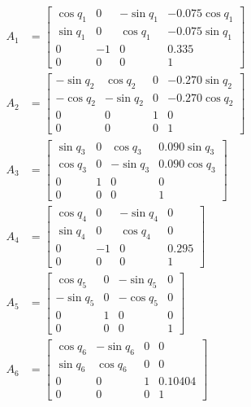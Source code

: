 \begin{align}
    A_1 &= \begin{bmatrix}
        \cos q_1 & 0 & -\sin q_1 & -0.075\cos q_1 \\
        \sin q_1 & 0 &  \cos q_1 & -0.075\sin q_1 \\
        0        & -1 & 0        & 0.335          \\
        0        & 0  & 0        & 1
    \end{bmatrix} \label{eq:A1} \\
    A_2 &= \begin{bmatrix}
        -\sin q_2 &  \cos q_2 & 0 & -0.270\sin q_2 \\
        -\cos q_2 & -\sin q_2 & 0 & -0.270\cos q_2 \\
        0         & 0         & 1 & 0              \\
        0         & 0         & 0 & 1
    \end{bmatrix} \label{eq:A2} \\
    A_3 &= \begin{bmatrix}
        \sin q_3 & 0 &  \cos q_3 & 0.090\sin q_3 \\
        \cos q_3 & 0 & -\sin q_3 & 0.090\cos q_3 \\
        0        & 1 & 0         & 0             \\
        0        & 0 & 0         & 1
    \end{bmatrix} \label{eq:A3} \\
    A_4 &= \begin{bmatrix}
        \cos q_4 & 0 & -\sin q_4 & 0     \\
        \sin q_4 & 0 &  \cos q_4 & 0     \\
        0        & -1 & 0        & 0.295 \\
        0        & 0  & 0        & 1
    \end{bmatrix} \label{eq:A4} \\
    A_5 &= \begin{bmatrix}
        \cos q_5  & 0 & -\sin q_5 & 0 \\
        -\sin q_5 & 0 & -\cos q_5 & 0 \\
        0         & 1 & 0         & 0 \\
        0         & 0 & 0         & 1
    \end{bmatrix} \label{eq:A5} \\
    A_6 &= \begin{bmatrix}
        \cos q_6 & -\sin q_6 & 0 & 0       \\
        \sin q_6 &  \cos q_6 & 0 & 0       \\
        0        & 0         & 1 & 0.10404 \\
        0        & 0         & 0 & 1
    \end{bmatrix} \label{eq:A6}
\end{align}

